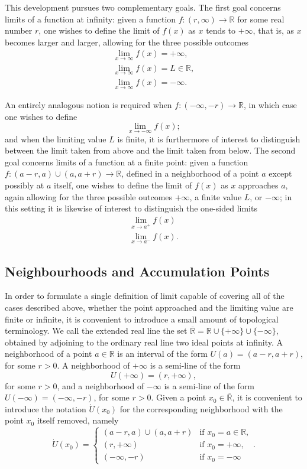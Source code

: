 This development pursues two complementary goals. The first goal concerns limits of a function at infinity: given a function $f : (r, \infty) \to \mathbb{R}$ for some real number $r$, one wishes to define the limit of $f(x)$ as $x$ tends to $+\infty$, that is, as $x$ becomes larger and larger, allowing for the three possible outcomes
\[
\begin{gathered}
\lim_{x \to \infty} f(x) = +\infty, \\
\lim_{x \to \infty} f(x) = L \in \mathbb{R}, \\
\lim_{x \to \infty} f(x) = -\infty.
\end{gathered}
\]

An entirely analogous notion is required when $f : (-\infty, -r) \to \mathbb{R}$, in which case one wishes to define \[
\lim_{x \to -\infty} f(x);
\] and when the limiting value $L$ is finite, it is furthermore of interest to distinguish between the limit taken from above and the limit taken from below. The second goal concerns limits of a function at a finite point: given a function $f : (a-r, a) \cup (a, a+r) \to \mathbb{R}$, defined in a neighborhood of a point $a$ except possibly at $a$ itself, one wishes to define the limit of $f(x)$ as $x$ approaches $a$, again allowing for the three possible outcomes $+\infty$, a finite value $L$, or $-\infty$; in this setting it is likewise of interest to distinguish the one-sided limits
\[
\begin{gathered}
\lim_{x \to a^+} f(x) \\
\lim_{x \to a^-} f(x).
\end{gathered}
\]

\subsection{Neighbourhoods and Accumulation Points}

In order to formulate a single definition of limit capable of covering all of the cases described above, whether the point approached and the limiting value are finite or infinite, it is convenient to introduce a small amount of topological terminology. We call the extended real line the set $\overline{\mathbb{R}} = \mathbb{R} \cup \{+\infty\} \cup \{-\infty\}$, obtained by adjoining to the ordinary real line two ideal points at infinity. A neighborhood of a point $a \in \mathbb{R}$ is an interval of the form $U(a) = (a-r, a+r)$, for some $r > 0$. A neighborhood of $+\infty$ is a semi-line of the form
\[
U(+\infty) = (r, +\infty),
\] for some $r > 0$, and a neighborhood of $-\infty$ is a semi-line of the form $U(-\infty) = (-\infty, -r)$, for some $r > 0$. Given a point $x_0 \in \overline{\mathbb{R}}$, it is convenient to introduce the notation $\dot{U}(x_0)$ for the corresponding neighborhood with the point $x_0$ itself removed, namely
\[
\dot{U}(x_0) =
\begin{cases}
(a-r, a) \cup (a, a+r) & \text{if } x_0 = a \in \mathbb{R}, \\
(r, +\infty) & \text{if } x_0 = +\infty, \\
(-\infty, -r) & \text{if } x_0 = -\infty
\end{cases}.
\]

